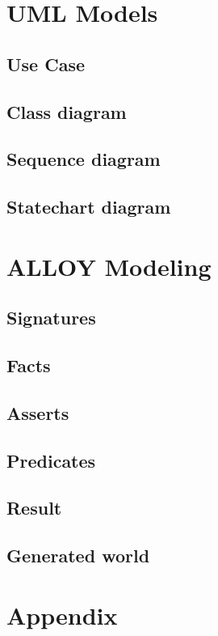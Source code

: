 \documentclass[18pt,oneside,a4paper, titlepage]{article}
\begin{document}
\section{UML Models}
	\subsection{Use Case}
	\subsection{Class diagram}
	\subsection{Sequence diagram}
	\subsection{Statechart diagram}

\newpage
\section{ALLOY Modeling}
	\subsection{Signatures}
	\subsection{Facts}
	\subsection{Asserts}
	\subsection{Predicates}
	\subsection{Result}
	\subsection{Generated world}

\newpage
\section{Appendix}
\end{document}
